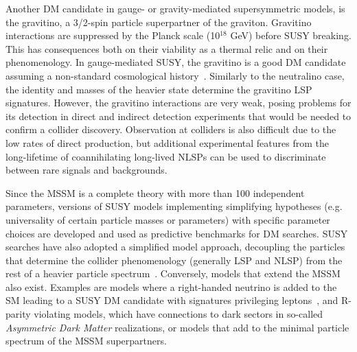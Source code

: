 Another DM candidate in gauge- or gravity-mediated supersymmetric models, is the gravitino, 
a 3/2-spin particle superpartner of the graviton. 
Gravitino interactions are suppressed by the Planck scale (10$^18$ GeV) before SUSY breaking.
This has consequences both on their viability as a thermal relic and on their phenomenology. 
In gauge-mediated SUSY, the gravitino is a good DM candidate assuming a
non-standard cosmological history~\cite{Steffen:2007sp}. 
Similarly to the neutralino case, the identity and masses of the heavier state determine the
gravitino LSP signatures. However, the gravitino interactions are very weak, posing problems for 
its detection in direct and indirect detection experiments that would be needed to confirm 
a collider discovery. Observation at colliders is also difficult due to the low rates of direct production,
but additional experimental features from the long-lifetime of coannihilating long-lived NLSPs
can be used to discriminate between rare signals and backgrounds. 


Since the MSSM is a complete theory with more than 100 independent parameters, 
versions of SUSY models implementing simplifying hypotheses (e.g. universality of certain
particle masses or parameters) with specific parameter choices 
are developed and used as predictive benchmarks for DM searches. 
SUSY searches have also adopted a simplified
model approach, decoupling the particles that determine the collider
phenomenology (generally LSP and NLSP)
from the rest of a heavier particle spectrum~\cite{Alves:2011wf}. 
Conversely, models that extend the MSSM also exist. Examples are models where a right-handed neutrino
is added to the SM leading to a SUSY DM candidate with signatures privileging leptons~\cite{Arina:2015uea},%
and R-parity violating models, which have connections to dark sectors in so-called \textit{Asymmetric Dark Matter} realizations, 
or models that add to the minimal particle spectrum of the MSSM superpartners. 

